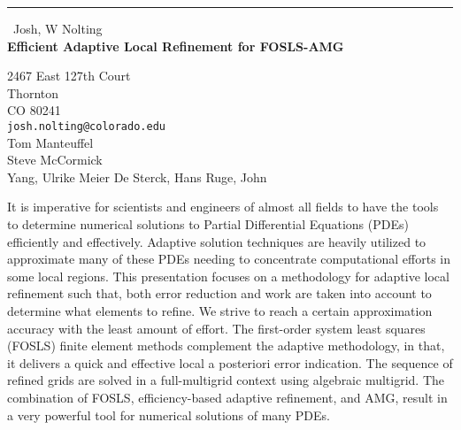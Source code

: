 \documentclass{report}
\begin{document}
\begin{center}
\rule{6in}{1pt} \
{\large Josh, W Nolting \\
{\bf Efficient Adaptive Local Refinement for FOSLS-AMG}}

2467 East 127th Court \\ Thornton \\ CO 80241
\\
{\tt josh.nolting@colorado.edu}\\
Tom Manteuffel\\
Steve McCormick\\
	Yang, Ulrike Meier
	De Sterck, Hans
	Ruge, John\end{center}

It is imperative for scientists and engineers of almost all fields to
have the tools to determine numerical solutions to Partial Differential
Equations (PDEs) efficiently and effectively. Adaptive solution
techniques are heavily utilized to approximate many of these PDEs needing
to concentrate computational efforts in some local regions. This
presentation focuses on
a methodology for adaptive local refinement such that, both error
reduction and work are taken into account to determine what elements to
refine. We strive to reach a certain approximation accuracy with the
least amount of effort. The first-order system least squares (FOSLS)
finite element methods complement the adaptive methodology, in that, it
delivers a quick and effective local a posteriori error indication. The
sequence of refined grids are solved in a full-multigrid context using
algebraic multigrid. The combination of FOSLS, efficiency-based adaptive
refinement, and AMG, result in a very powerful tool for numerical
solutions of many PDEs.
\end{document}
